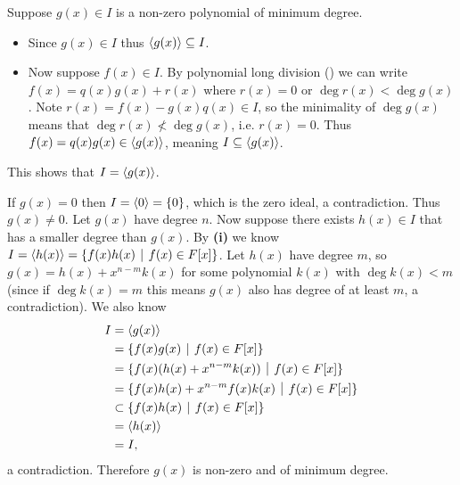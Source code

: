 \begin{questions}
    \item \begin{partquestions}{\roman*}
        \item Suppose $g(x) \in I$ is a non-zero polynomial of minimum degree.
        \begin{itemize}
            \item Since $g(x) \in I$ thus $\left\langle g(x)\right\rangle \subseteq I$.
            \item Now suppose $f(x) \in I$. By polynomial long division () we can write $f(x) = q(x)g(x) + r(x)$ where $r(x) = 0$ or $\deg r(x) < \deg g(x)$. Note $r(x) = f(x) - g(x)q(x) \in I$, so the minimality of $\deg g(x)$ means that $\deg r(x) \not< \deg g(x)$, i.e. $r(x) = 0$. Thus $f(x) = q(x)g(x) \in \left\langle g(x)\right\rangle$, meaning $I \subseteq \left\langle g(x)\right\rangle$.
        \end{itemize}
        This shows that $I = \left\langle g(x)\right\rangle$.

        \item If $g(x) = 0$ then $I = \left\langle0\right\rangle = \{0\}$, which is the zero ideal, a contradiction. Thus $g(x) \neq 0$. Let $g(x)$ have degree $n$. Now suppose there exists $h(x) \in I$ that has a smaller degree than $g(x)$. By \textbf{(i)} we know $I = \princ{h(x)} = \{f(x)h(x) \vert f(x) \in F[x]\}$. Let $h(x)$ have degree $m$, so $g(x) = h(x) + x^{n-m}k(x)$ for some polynomial $k(x)$ with $\deg k(x) < m$ (since if $\deg k(x) = m$ this means $g(x)$ also has degree of at least $m$, a contradiction). We also know
        \begin{align*}
            I &= \princ{g(x)}\\
            &= \{f(x)g(x) \vert f(x) \in F[x]\}\\
            &= \{f(x)(h(x) + x^{n-m}k(x)) \vert f(x) \in F[x]\}\\
            &= \{f(x)h(x) + x^{n-m}f(x)k(x) \vert f(x) \in F[x]\}\\
            &\subset \{f(x)h(x) \vert f(x) \in F[x]\}\\
            &= \princ{h(x)}\\
            &= I,
        \end{align*}
        a contradiction. Therefore $g(x)$ is non-zero and of minimum degree.
    \end{partquestions}


\end{questions}
